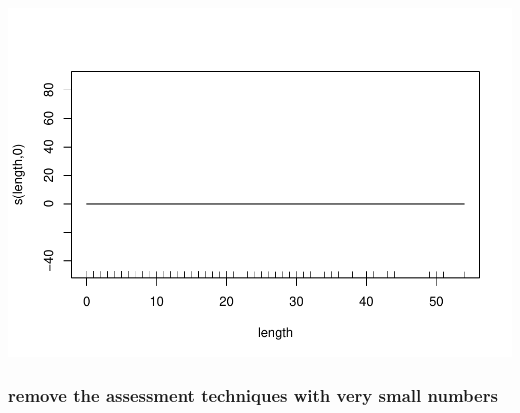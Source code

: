 \documentclass[]{elsarticle} %
\begin{document}
\includegraphics{Forest_and_Water_files/figure-latex/model7_noLatb-3.pdf}

\hypertarget{remove-the-assessment-techniques-with-very-small-numbers}{%
\subsubsection{remove the assessment techniques with very small
numbers}\label{remove-the-assessment-techniques-with-very-small-numbers}}
\end{document}
